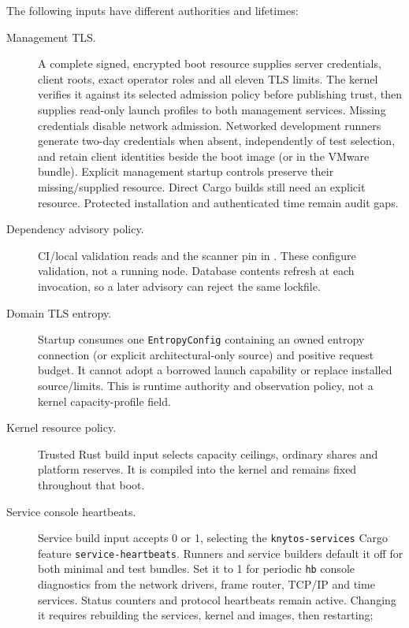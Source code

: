 The following inputs have different authorities and lifetimes:
\begin{description}
    \item[Management TLS.] A complete signed, encrypted boot resource supplies
        server credentials, client roots, exact operator roles and all eleven
        TLS limits. The kernel verifies it against its selected admission policy
        before publishing trust, then supplies read-only launch profiles to both
        management services. Missing credentials disable network admission.
        Networked development runners generate two-day credentials when absent,
        independently of test selection, and retain client identities beside the
        boot image (or in the VMware bundle). Explicit management startup controls
        preserve their missing/supplied resource. Direct Cargo builds still need
        an explicit resource.
        Protected installation and authenticated time remain audit gaps.
    \item[Dependency advisory policy.] CI/local validation reads
         and the scanner pin in .
        These configure validation, not a running node. Database contents refresh
        at each invocation, so a later advisory can reject the same lockfile.
    \item[Domain TLS entropy.] Startup consumes one \texttt{EntropyConfig}
        containing an owned entropy connection (or explicit architectural-only
        source) and positive request budget. It cannot adopt a borrowed launch
        capability or replace installed source/limits. This is runtime authority
        and observation policy, not a kernel capacity-profile field.
    \item[Kernel resource policy.] Trusted Rust build input selects capacity
        ceilings, ordinary shares and platform reserves. It is compiled into
        the kernel and remains fixed throughout that boot.
    \item[Service console heartbeats.] Service build input
         accepts 0 or 1, selecting the
        \texttt{knytos-services} Cargo feature \texttt{service-heartbeats}.
        Runners and service builders default it off for both minimal and test
        bundles. Set it to 1 for periodic \texttt{hb} console diagnostics
        from the network drivers, frame router, TCP/IP and time services.
        Status counters and protocol heartbeats remain active. Changing it
        requires rebuilding the services, kernel and images, then restarting;

\end{description}
